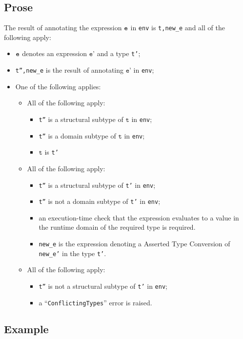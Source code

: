 \documentclass{book}
\newcommand\vt[0]{\texttt{t}}
\newcommand\vep[0]{\texttt{e'}}
\begin{document}
\begin{itemize}
  \subsection{Prose}
  The result of annotating the expression $\texttt{e}$ in \texttt{env} is
\texttt{t,new\_e} and all of the following apply:
  \begin{itemize}
  \item $\texttt{e}$ denotes an expression $\vep$ and a type \texttt{t'};
  \item \texttt{t'',new\_e} is the result of annotating $\vep$ in \texttt{env};
  \item One of the following applies:
    \begin{itemize}
    \item All of the following apply:
      \begin{itemize}
      \item \texttt{t''} is a structural subtype of $\vt$ in \texttt{env};
      \item \texttt{t''} is a domain subtype of $\vt$ in \texttt{env};
      \item $\vt$ is \texttt{t'}
      \end{itemize}
    \item All of the following apply:
      \begin{itemize}
      \item \texttt{t''} is a structural subtype of \texttt{t'} in \texttt{env};
      \item \texttt{t''} is not a domain subtype of \texttt{t'} in \texttt{env};
      \item an execution-time check that the expression evaluates to a value in the
        runtime domain of the required type is required.
      \item \texttt{new\_e} is the expression denoting a Asserted Type
        Conversion of \texttt{new\_e'} in the type \texttt{t'}.
     \end{itemize}
   \item All of the following apply:
     \begin{itemize}
     \item \texttt{t''} is not a structural subtype of \texttt{t'} in \texttt{env};
     \item a ``\texttt{ConflictingTypes}'' error is raised.
     \end{itemize}
   \end{itemize}
  \end{itemize}

  \subsection{Example}


\end{itemize}
\end{document}
